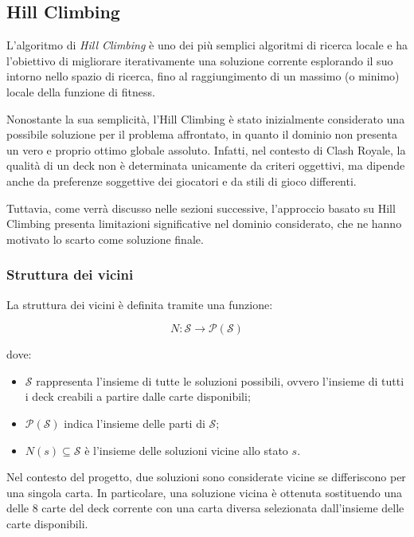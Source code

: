 \documentclass{article}
\begin{document}
\subsection{Hill Climbing}

L’algoritmo di \textit{Hill Climbing} è uno dei più semplici algoritmi di ricerca locale e ha l’obiettivo di migliorare iterativamente una soluzione corrente esplorando il suo intorno nello spazio di ricerca, fino al raggiungimento di un massimo (o minimo) locale della funzione di fitness.

Nonostante la sua semplicità, l’Hill Climbing è stato inizialmente considerato una possibile soluzione per il problema affrontato, in quanto il dominio non presenta un vero e proprio ottimo globale assoluto. 
Infatti, nel contesto di Clash Royale, la qualità di un deck non è determinata unicamente da criteri oggettivi, ma dipende anche da preferenze soggettive dei giocatori e da stili di gioco differenti.

Tuttavia, come verrà discusso nelle sezioni successive, l’approccio basato su Hill Climbing presenta limitazioni significative nel dominio considerato, che ne hanno motivato lo scarto come soluzione finale.

\subsubsection{Struttura dei vicini}

La struttura dei vicini è definita tramite una funzione:

\[
N : \mathcal{S} \rightarrow \mathcal{P}(\mathcal{S})
\]

dove:
\begin{itemize}
    \item $\mathcal{S}$ rappresenta l’insieme di tutte le soluzioni possibili, ovvero l’insieme di tutti i deck creabili a partire dalle carte disponibili;
    \item $\mathcal{P}(\mathcal{S})$ indica l’insieme delle parti di $\mathcal{S}$;
    \item $N(s) \subseteq \mathcal{S}$ è l’insieme delle soluzioni vicine allo stato $s$.
\end{itemize}

Nel contesto del progetto, due soluzioni sono considerate vicine se differiscono per una singola carta. 
In particolare, una soluzione vicina è ottenuta sostituendo una delle 8 carte del deck corrente con una carta diversa selezionata dall’insieme delle carte disponibili.
\end{document}
